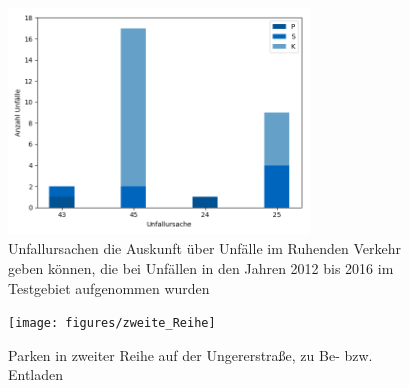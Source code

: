 \begin{savenotes}
	\begin{figure}[H]
		\centering
		\includegraphics[width=8cm,height=6cm]{figures/Urs_Parken}
		\caption[Unfallursachen die Auskunft über Unfälle im Ruhenden Verkehr geben können, die bei Unfällen in den Jahren 2012 bis 2016 im Testgebiet aufgenommen wurden]{Unfallursachen die Auskunft über Unfälle im Ruhenden Verkehr geben können, die bei Unfällen in den Jahren 2012 bis 2016 im Testgebiet aufgenommen wurden}\label{fig:Unfallursachen_ruhender_Verkehr}
	\end{figure}
\end{savenotes}

\begin{savenotes}
	\begin{figure}[H]
		\centering
		\texttt{[image: figures/zweite\_Reihe]}
		\caption[Parken in zweiter Reihe auf der Ungererstraße, zu Be- bzw. Entladen]{Parken in zweiter Reihe auf der Ungererstraße, zu Be- bzw. Entladen}\label{fig:Parken_zweite_Reihe}
	\end{figure}
\end{savenotes}

